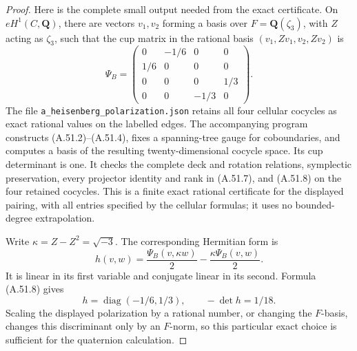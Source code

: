 \begin{proof}
Here is the complete small output needed from the
exact certificate. On \(eH^1(C,\mathbf Q)\),
there are vectors \(v_1,v_2\) forming a basis
over \(F=\mathbf Q(\zeta_3)\), with \(Z\)
acting as \(\zeta_3\), such that the cup matrix
in the rational basis \((v_1,Zv_1,v_2,Zv_2)\) is
\[
 \Psi_B=
 \begin{pmatrix}
 0&-1/6&0&0\\1/6&0&0&0\\
 0&0&0&1/3\\0&0&-1/3&0
 \end{pmatrix}.                                  \tag{A.51.8}
\]
The file \texttt{a\_heisenberg\_polarization.json}
retains all four cellular cocycles as exact rational
values on the labelled edges. The accompanying
program constructs (A.51.2)--(A.51.4), fixes a
spanning-tree gauge for coboundaries, and computes
a basis of the resulting twenty-dimensional
cocycle space. Its cup determinant is one.
It checks the complete deck and rotation relations,
symplectic preservation, every projector identity
and rank in (A.51.7), and (A.51.8) on the four
retained cocycles. This is a finite exact rational
certificate for the displayed pairing, with all
entries specified by the cellular formulas; it
uses no bounded-degree extrapolation.

Write \(\kappa=Z-Z^2=\sqrt{-3}\). The
corresponding Hermitian form is
\[
 h(v,w)=\frac{\Psi_B(v,\kappa w)}2
                  -\frac{\kappa\Psi_B(v,w)}2.
                                                               \tag{A.51.9}
\]
It is linear in its first variable and conjugate
linear in its second. Formula (A.51.8) gives
\[
                  h=\operatorname{diag}(-1/6,1/3),
                    \qquad-\det h=1/18.             \tag{A.51.10}
\]
Scaling the displayed polarization by a rational
number, or changing the \(F\)-basis, changes this
discriminant only by
an \(F\)-norm, so this particular exact choice
is sufficient for the quaternion calculation.


\end{proof}
